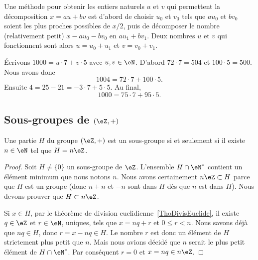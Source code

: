 \begin{normaltext}
	Une méthode pour obtenir les entiers naturels \( u\) et \( v\) qui permettent la décomposition \(x = au + bv \) est d'abord de choisir \( u_0\) et \( v_0\) tels que \( au_0 \) et \( bv_0 \) soient les plus proches possibles de \( x/2\), puis de décomposer le nombre (relativement petit) \( x - au_0 - bv_0 \) en \( au_1 + bv_1 \). Deux nombres \( u\) et \( v\) qui fonctionnent sont alors \( u = u_0 + u_1\) et \( v = v_0 + v_1\).
\end{normaltext}

\begin{example}
	Écrivons \( 1000=u\cdot 7+v\cdot 5\) avec \( u,v\in \eN\). D'abord \( 72\cdot 7=504\) et \( 100\cdot 5=500\). Nous avons donc
	\begin{equation}
		1004=72\cdot 7+100\cdot 5.
	\end{equation}
	Ensuite \( 4=25-21=-3\cdot 7+5\cdot 5\). Au final,
	\begin{equation}
		1000=75\cdot 7+95\cdot 5.
	\end{equation}
\end{example}

\subsection{Sous-groupes de \texorpdfstring{\( (\eZ,+)\)}{(Z,+)}}

\begin{proposition} \label{PropSsgpZestnZ}
	Une partie \( H\) du groupe \( (\eZ,+)\) est un sous-groupe si et seulement si il existe \( n\in\eN\) tel que \( H=n\eZ\).
\end{proposition}

\begin{proof}
	Soit \( H\neq\{ 0 \}\) un sous-groupe de \( \eZ\). L'ensemble \( H\cap\eN^*\) contient un élément minimum que nous notons \( n\). Nous avons certainement \( n\eZ\subset H\) parce que \( H\) est un groupe (donc \( n+n\) et \( -n\) sont dans \( H\) dès que \( n\) est dans \( H\)). Nous devons prouver que \( H\subset n\eZ\).

	Si \( x\in H\), par le théorème de division euclidienne~\ref{ThoDivisEuclide}, il existe \( q\in\eZ\) et \( r\in\eN \), uniques, tels que \( x=nq+r\) et \(0 \leq r < n \). Nous savons déjà que \( nq\in H\), donc \( r = x - nq \in H \). Le nombre \( r\) est donc un élément de \( H\) strictement plus petit que \( n\). Mais nous avions décidé que \( n\) serait le plus petit élément de \( H\cap\eN^*\). Par conséquent \( r=0\) et \( x=nq\in n\eZ\).
\end{proof}


